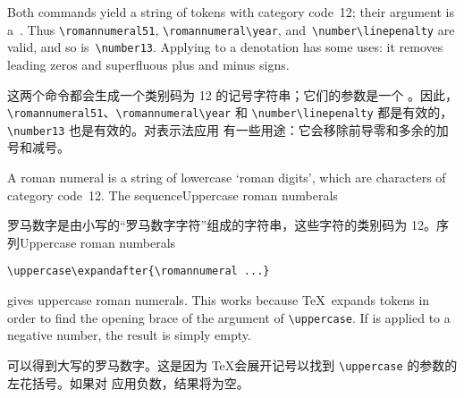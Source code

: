 \documentclass[twoside,letterpaper]{rapport3}
\begin{document}
Both commands
yield a string of tokens with category code~12;
their argument is a~.
Thus \verb-\romannumeral51-, \verb-\romannumeral\year-,
and~\verb-\number\linepenalty- are valid, and so is~\verb-\number13-.
Applying  to a denotation has some uses:
it removes leading zeros and superfluous plus and minus signs.

这两个命令都会生成一个类别码为 12 的记号字符串；它们的参数是一个 。因此，\verb-\romannumeral51-、\verb-\romannumeral\year- 和 \verb-\number\linepenalty- 都是有效的，\verb-\number13- 也是有效的。对表示法应用  有一些用途：它会移除前导零和多余的加号和减号。

A roman numeral is a string of lowercase `roman digits',
which are characters of category code~12.
The sequence\howto Uppercase roman numberals\par

罗马数字是由小写的“罗马数字字符”组成的字符串，这些字符的类别码为 12。序列\howto Uppercase roman numberals\par
\begin{verbatim}
\uppercase\expandafter{\romannumeral ...}
\end{verbatim}
gives uppercase roman numerals.
This works because \TeX\  expands
tokens in order to find the opening brace of the argument
of \verb=\uppercase=. If  is applied to
a negative number, the result is simply empty.

可以得到大写的罗马数字。这是因为 \TeX 会展开记号以找到 \verb=\uppercase= 的参数的左花括号。如果对  应用负数，结果将为空。
\end{document}
